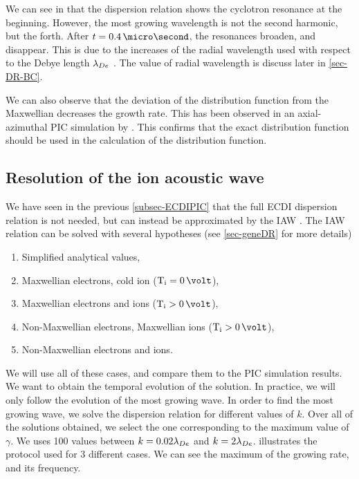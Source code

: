     We can see in  that the dispersion relation shows the cyclotron resonance at the beginning.
    However, the most growing wavelength is not the second harmonic, but the forth.
    After $t=0.4\,\micro\second$, the resonances broaden, and disappear.
    This is due to the increases of the radial wavelength used with respect to the Debye length $\lambda_{De}$ \citep{lafleur2016a,ducrocq2006,cavalier2013}.
    The value of radial wavelength is discuss later in \cref{sec-DR-BC}.
    
    We can also observe that the deviation of the distribution function from the Maxwellian decreases the growth rate.
    This has been observed  in an axial-azimuthal \ac{PIC} simulation by \citet{lafleur2018}.
    This confirms that the exact distribution function should be used in the calculation of the distribution function.
    
  \subsection{Resolution of the ion acoustic wave} \label{subsec-VDFIAW}
  
  We have seen in the previous \cref{subsec-ECDIPIC} that the full \ac{ECDI} dispersion relation is not needed, but can instead be approximated by the \ac{IAW} \citep{lafleur2018,janhunen2018,taccogna2019}.
  The \ac{IAW} relation can be solved with several hypotheses (see \cref{sec-geneDR} for more details)
  \begin{enumerate}
    \item Simplified analytical values,
    \item Maxwellian electrons, cold ion ($\Ti = 0\,\volt$),
    \item Maxwellian electrons and ions ($\Ti > 0\,\volt$),
    \item Non-Maxwellian electrons, Maxwellian ions ($\Ti > 0\,\volt$),
    \item Non-Maxwellian electrons and ions.
  \end{enumerate}
  
  We will use all of these cases, and compare them to the \ac{PIC} simulation results.
  We want to obtain the temporal evolution of the solution.
  In practice, we will only follow the evolution of the most growing wave.
  In order to find the most growing wave, we solve the dispersion relation for different values of $k$.
  Over all of the solutions obtained, we select the one corresponding to the maximum value of $\gamma$.
  We uses 100 values between $k=0.02 \lambda_{De}$ and $k = 2 \lambda_{De}$.
   illustrates the protocol used for 3 different cases.
  We can see the maximum of the growing rate, and its frequency.
  
